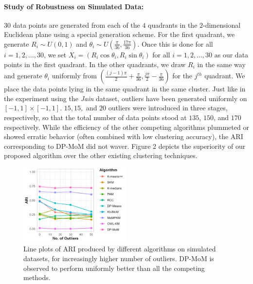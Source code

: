 \documentclass[11pt]{article}
\begin{document}
\paragraph{Study of Robustness on Simulated Data:} $30$ data points are generated from each of the $4$ quadrants in the $2$-dimensional Euclidean plane using a special generation scheme. For the first quadrant, we generate $R_i \sim U(0, 1)$ and $\theta_i \sim U\left(\frac{\pi}{36}, \frac{17\pi}{36}\right)$. Once this is done for all $i=1,2,\ldots,30$, we set $X_i = (R_i\cos\theta_i, R_i\sin \theta_i)$ for all $i=1,2,\ldots,30$ as our data points in the first quadrant. In the other quadrants, we draw $R_i$ in the same way and generate $\theta_i$ uniformly from $\left(\frac{(j - 1)\pi}{2} + \frac{\pi}{36}, \frac{j\pi}{2} - \frac{\pi}{36}\right)$ for the $j^{th}$ quadrant. We place the data points lying in the same quadrant in the same cluster. Just like in the experiment using the \textit{Jain} dataset, outliers have been generated uniformly on $[-1, 1] \times [-1, 1]$. $15, 15,$ and $20$ outliers were introduced in three stages, respectively, so that the total number of data points stood at $135$, $150$, and $170$ respectively. While the efficiency of the other competing algorithms plummeted or showed erratic behavior (often combined with low clustering accuracy), the ARI corresponding to DP-MoM did not waver. Figure 2 depicts the superiority of our proposed algorithm over the other existing clustering techniques.

\begin{figure}[!htb]
    \centering
    \includegraphics[width=0.5\textwidth]{Diagrams/plot-ari-sim-light-0.6.png}
    \caption{Line plots of ARI produced by different algorithms on simulated datasets, for increasingly higher number of outliers. DP-MoM is observed to perform uniformly better than all the competing methods.}
    \label{fig:plot-sim-ari}
\end{figure}
\end{document}
